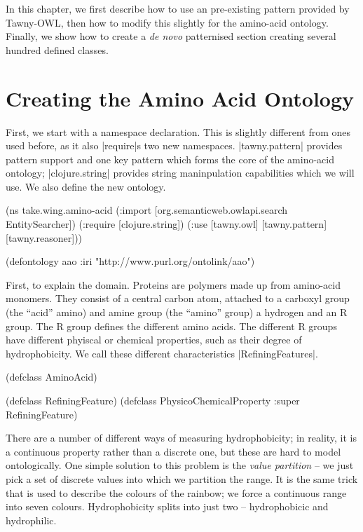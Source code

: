 In this chapter, we first describe how to use an pre-existing pattern provided
by Tawny-OWL, then how to modify this slightly for the amino-acid ontology.
Finally, we show how to create a \textit{de novo} patternised section creating
several hundred defined classes.

\section{Creating the Amino Acid Ontology}
\label{sec:creating-amino-acid}

First, we start with a namespace declaration. This is slightly different from
ones used before, as it also |require|s two new namespaces. |tawny.pattern|
provides pattern support and one key pattern which forms the core of the
amino-acid ontology; |clojure.string| provides string maninpulation
capabilities which we will use. We also define the new ontology.

\begin{tawny}
(ns take.wing.amino-acid
  (:import [org.semanticweb.owlapi.search EntitySearcher])
  (:require [clojure.string])
  (:use [tawny.owl]
        [tawny.pattern]
        [tawny.reasoner]))

(defontology aao
  :iri "http://www.purl.org/ontolink/aao")
\end{tawny}

First, to explain the domain. Proteins are polymers made up from amino-acid
monomers. They consist of a central carbon atom, attached to a carboxyl group
(the ``acid'' amino) and amine group (the ``amino'' group) a hydrogen and an R
group. The R group defines the different amino acids. The different R groups
have different phyiscal or chemical properties, such as their degree of
hydrophobicity. We call these different characteristics |RefiningFeatures|.

\begin{tawny}
(defclass AminoAcid)

(defclass RefiningFeature)
(defclass PhysicoChemicalProperty :super RefiningFeature)
\end{tawny}

There are a number of different ways of measuring hydrophobicity; in reality,
it is a continuous property rather than a discrete one, but these are hard to
model ontologically. One simple solution to this problem is the \emph{value
  partition} -- we just pick a set of discrete values into which we partition
the range. It is the same trick that is used to describe the colours of the
rainbow; we force a continuous range into seven colours. Hydrophobicity splits
into just two -- hydrophobicic and hydrophilic.

